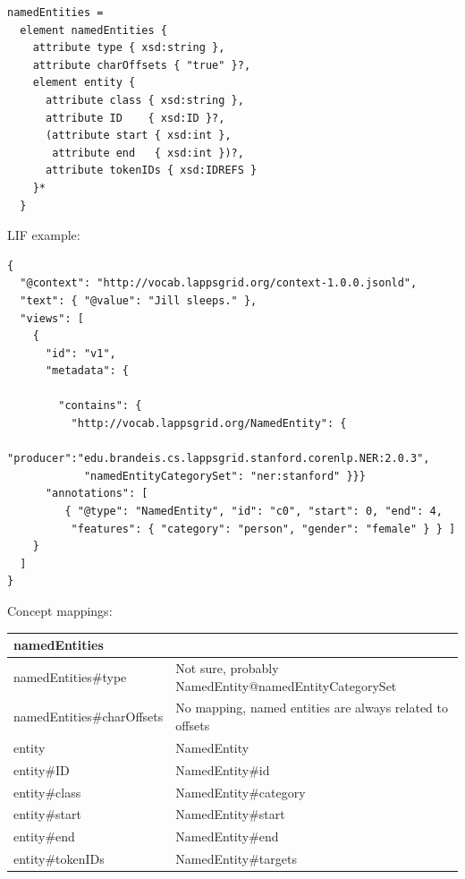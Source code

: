 \documentclass[11pt]{article}
\newenvironment{example}
    {\begin{tcolorbox}\small}
    {\end{tcolorbox}}
\newenvironment{mappings}
	{\medskip\begin{tabular}{|l|l|}\hline}
	{\hline\end{tabular}\medskip}
\begin{document}
\begin{example}
\begin{verbatim}
namedEntities =
  element namedEntities {
    attribute type { xsd:string },
    attribute charOffsets { "true" }?,
    element entity {
      attribute class { xsd:string },
      attribute ID    { xsd:ID }?,
      (attribute start { xsd:int },
       attribute end   { xsd:int })?,
      attribute tokenIDs { xsd:IDREFS }
    }*
  }
\end{verbatim}
\end{example}

\newpage
LIF example:

\begin{example}
\begin{verbatim}
{
  "@context": "http://vocab.lappsgrid.org/context-1.0.0.jsonld",
  "text": { "@value": "Jill sleeps." },
  "views": [
    {
      "id": "v1",
      "metadata": {
      
        "contains": {
          "http://vocab.lappsgrid.org/NamedEntity": {
            "producer":"edu.brandeis.cs.lappsgrid.stanford.corenlp.NER:2.0.3",
            "namedEntityCategorySet": "ner:stanford" }}}
      "annotations": [
         { "@type": "NamedEntity", "id": "c0", "start": 0, "end": 4,
          "features": { "category": "person", "gender": "female" } } ]
    }
  ]
}
\end{verbatim}
\end{example}

Concept mappings:

\begin{mappings}
namedEntities				& \\ \hline
namedEntities\#type			& Not sure, probably NamedEntity@namedEntityCategorySet		\\ \hline
namedEntities\#charOffsets	& No mapping, named entities are always related to offsets	\\ \hline
entity						& NamedEntity 												\\ \hline
entity\#ID					& NamedEntity\#id											\\ \hline
entity\#class 				& NamedEntity\#category								 		\\ \hline
entity\#start 				& NamedEntity\#start										\\ \hline
entity\#end 				& NamedEntity\#end											\\ \hline
entity\#tokenIDs 			& NamedEntity\#targets										\\ \hline
\end{mappings}
\end{document}
